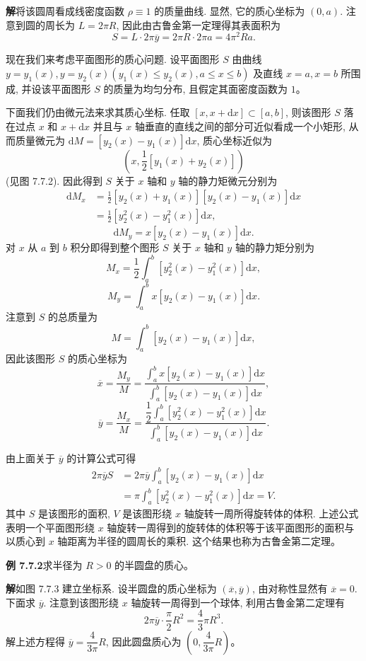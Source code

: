 \documentclass[UTF8, 12pt, fontset=fandol, oneside]{ctexart}
\begin{document}
\noindent\textbf{解}\quad 将该圆周看成线密度函数 $\rho\equiv1$ 的质量曲线. 显然, 它的质心坐标为 $(0,a)$. 注意到圆的周长为 $L=2\pi R$, 因此由古鲁金第一定理得其表面积为
\[
  S=L\cdot2\pi\overline y=2\pi R\cdot2\pi a=4\pi^2Ra.
\]

现在我们来考虑平面图形的质心问题. 设平面图形 $S$ 由曲线 $y=y_1(x),y=y_2(x)(y_1(x)\leq y_2(x),a\leq x\leq b)$ 及直线 $x=a,x=b$ 所围成, 并设该平面图形 $S$ 的质量为均匀分布, 且假定其面密度函数为 $1$。

下面我们仍由微元法来求其质心坐标. 任取 $[x,x+\mathrm dx]\subset[a,b]$, 则该图形 $S$ 落在过点 $x$ 和 $x+\mathrm dx$ 并且与 $x$ 轴垂直的直线之间的部分可近似看成一个小矩形, 从而质量微元为 $\mathrm dM=[y_2(x)-y_1(x)]\mathrm dx$, 质心坐标近似为
\[
  \left(x,\frac{1}{2}[y_1(x)+y_2(x)]\right)
\]
(见图 7.7.2). 因此得到 $S$ 关于 $x$ 轴和 $y$ 轴的静力矩微元分别为
\[
\begin{aligned}
  \mathrm dM_x
  &=\frac{1}{2}[y_2(x)+y_1(x)][y_2(x)-y_1(x)]\mathrm dx\\
  &=\frac{1}{2}[y_2^2(x)-y_1^2(x)]\mathrm dx,
\end{aligned}
\]
\[
  \mathrm dM_y=x[y_2(x)-y_1(x)]\mathrm dx.
\]
对 $x$ 从 $a$ 到 $b$ 积分即得到整个图形 $S$ 关于 $x$ 轴和 $y$ 轴的静力矩分别为
\[
  M_x=\frac{1}{2}\int_a^b [y_2^2(x)-y_1^2(x)]\mathrm dx,
\]
\[
  M_y=\int_a^b x[y_2(x)-y_1(x)]\mathrm dx.
\]
注意到 $S$ 的总质量为
\[
  M=\int_a^b [y_2(x)-y_1(x)]\mathrm dx,
\]
因此该图形 $S$ 的质心坐标为
\[
  \overline x=\frac{M_y}{M}
  =\frac{\int_a^b x[y_2(x)-y_1(x)]\mathrm dx}
  {\int_a^b [y_2(x)-y_1(x)]\mathrm dx},
\]
\[
  \overline y=\frac{M_x}{M}
  =\frac{\dfrac{1}{2}\int_a^b [y_2^2(x)-y_1^2(x)]\mathrm dx}
  {\int_a^b [y_2(x)-y_1(x)]\mathrm dx}.
\]

由上面关于 $\overline y$ 的计算公式可得
\[
\begin{aligned}
  2\pi\overline yS
  &=2\pi\overline y\int_a^b [y_2(x)-y_1(x)]\mathrm dx\\
  &=\pi\int_a^b [y_2^2(x)-y_1^2(x)]\mathrm dx=V.
\end{aligned}
\]
其中 $S$ 是该图形的面积, $V$ 是该图形绕 $x$ 轴旋转一周所得旋转体的体积. 上述公式表明一个平面图形绕 $x$ 轴旋转一周得到的旋转体的体积等于该平面图形的面积与以质心到 $x$ 轴距离为半径的圆周长的乘积. 这个结果也称为古鲁金第二定理。

\noindent\textbf{例 7.7.2}\quad 求半径为 $R>0$ 的半圆盘的质心。

\noindent\textbf{解}\quad 如图 7.7.3 建立坐标系. 设半圆盘的质心坐标为 $(\overline x,\overline y)$, 由对称性显然有 $\overline x=0$. 下面求 $\overline y$. 注意到该图形绕 $x$ 轴旋转一周得到一个球体, 利用古鲁金第二定理有
\[
  2\pi\overline y\cdot\frac{\pi}{2}R^2=\frac{4}{3}\pi R^3.
\]
解上述方程得 $\overline y=\dfrac{4}{3\pi}R$, 因此圆盘质心为 $\left(0,\dfrac{4}{3\pi}R\right)$。
\end{document}
